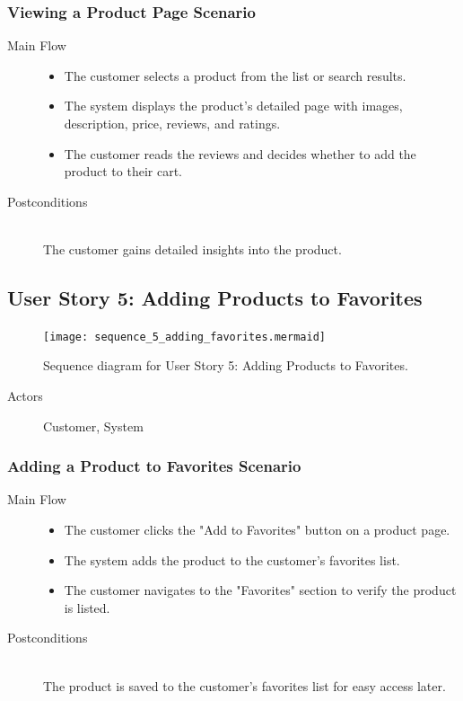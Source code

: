 \documentclass[twoside,a4paper,journal]{IEEEtran}
\begin{document}
\subsubsection{Viewing a Product Page Scenario}
\begin{description}
  \item[Main Flow] \hfill
    \begin{itemize}
      \item The customer selects a product from the list or search results.
      \item The system displays the product's detailed page with images,
        description, price, reviews, and ratings.
      \item The customer reads the reviews and decides whether to add the
        product to their cart.
    \end{itemize}
  \item[Postconditions] \hfill \\
    The customer gains detailed insights into the product.
\end{description}

\subsection{User Story 5: Adding Products to Favorites}
\begin{figure}[!t]
\centering
\texttt{[image: sequence\_5\_adding\_favorites.mermaid]}
\caption{Sequence diagram for User Story 5: Adding Products to Favorites.}
\label{fig:sequence_5}
\end{figure}
\begin{description}
  \item[Actors] Customer, System
\end{description}
\subsubsection{Adding a Product to Favorites Scenario}
\begin{description}
  \item[Main Flow] \hfill
    \begin{itemize}
      \item The customer clicks the "Add to Favorites" button on a product page.
      \item The system adds the product to the customer's favorites list.
      \item The customer navigates to the "Favorites" section to verify the
        product is listed.
    \end{itemize}
  \item[Postconditions] \hfill \\
    The product is saved to the customer's favorites list for easy access later.
\end{description}
\end{document}

